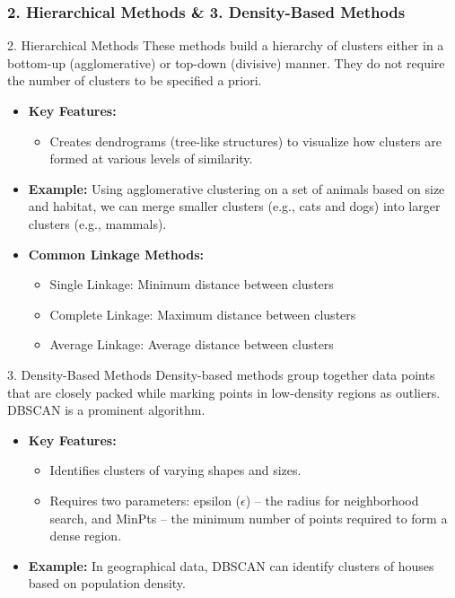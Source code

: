 \documentclass[aspectratio=169]{beamer}
\begin{document}
\begin{frame}[fragile]
    \frametitle{2. Hierarchical Methods \& 3. Density-Based Methods}
    
    \begin{block}{2. Hierarchical Methods}
        These methods build a hierarchy of clusters either in a bottom-up (agglomerative) or top-down (divisive) manner. They do not require the number of clusters to be specified a priori.
    \end{block}

    \begin{itemize}
        \item \textbf{Key Features:}
        \begin{itemize}
            \item Creates dendrograms (tree-like structures) to visualize how clusters are formed at various levels of similarity.
        \end{itemize}
    
        \item \textbf{Example:} Using agglomerative clustering on a set of animals based on size and habitat, we can merge smaller clusters (e.g., cats and dogs) into larger clusters (e.g., mammals).
        
        \item \textbf{Common Linkage Methods:}
        \begin{itemize}
            \item Single Linkage: Minimum distance between clusters
            \item Complete Linkage: Maximum distance between clusters
            \item Average Linkage: Average distance between clusters
        \end{itemize}
    \end{itemize}
   
    \begin{block}{3. Density-Based Methods}
        Density-based methods group together data points that are closely packed while marking points in low-density regions as outliers. DBSCAN is a prominent algorithm.
    \end{block}
    
    \begin{itemize}
        \item \textbf{Key Features:}
        \begin{itemize}
            \item Identifies clusters of varying shapes and sizes.
            \item Requires two parameters: epsilon (\( \epsilon \)) – the radius for neighborhood search, and MinPts – the minimum number of points required to form a dense region.
        \end{itemize}
    
        \item \textbf{Example:} In geographical data, DBSCAN can identify clusters of houses based on population density.
    \end{itemize}
\end{frame}
\end{document}
